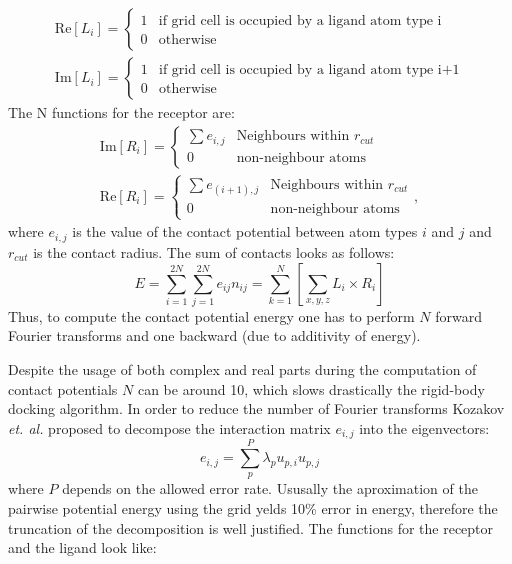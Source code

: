 \begin{eqnarray*}
 \mbox{Re}\left[L_{i}\right]=\begin{cases}
                  1 & \mbox{if grid cell is occupied by a ligand atom type i}\\
                  0 & \mbox{otherwise}
                 \end{cases}\\
 \mbox{Im}\left[L_{i}\right]=\begin{cases}
                  1 & \mbox{if grid cell is occupied by a ligand atom type i+1}\\
                  0 & \mbox{otherwise}
                 \end{cases}
\end{eqnarray*}
The N functions for the receptor are:
\begin{eqnarray*}
 \mbox{Im}\left[R_{i}\right]=\begin{cases}
                  \sum e_{i,j} & \mbox{Neighbours within }r_{cut}\\
                  0 & \mbox{non-neighbour atoms}
                 \end{cases}\\
 \mbox{Re}\left[R_{i}\right]=\begin{cases}
                  \sum e_{(i+1),j} & \mbox{Neighbours within }r_{cut}\\
                  0 & \mbox{non-neighbour atoms}
                 \end{cases},
\end{eqnarray*}
where $e_{i,j}$ is the value of the contact potential between atom types $i$ and $j$ and $r_{cut}$ is the contact radius. The sum of contacts looks as follows:
\begin{equation*}
 E = \sum^{2N}_{i=1}\sum^{2N}_{j=1}e_{ij}n_{ij} = \sum^{N}_{k=1}\left[\sum_{x,y,z} L_i \times R_i \right]
\end{equation*}
Thus, to compute the contact potential energy one has to perform $N$ forward Fourier transforms and one backward (due to additivity of energy).

Despite the usage of both complex and real parts during the computation of contact potentials $N$ can be around 10, which slows drastically the rigid-body docking algorithm.
In order to reduce the number of Fourier transforms Kozakov \emph{et. al.} \cite{kozakov2006piper} proposed to decompose the interaction matrix $e_{i,j}$ into the eigenvectors:
\begin{equation*}
 e_{i,j} = \sum_p^P \lambda_p u_{p,i} u_{p,j}
\end{equation*}
where $P$ depends on the allowed error rate. Ususally the aproximation of the pairwise potential energy using the grid yelds 10\% error in energy, therefore the truncation
of the decomposition is well justified. The functions for the receptor and the ligand look like:

